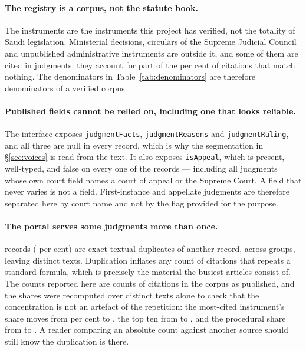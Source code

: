 \documentclass[11pt]{article}
\begin{document}
\paragraph{The registry is a corpus, not the statute book.} The
\nInstruments{} instruments are the instruments this project has verified,
not the totality of Saudi legislation. Ministerial decisions, circulars of
the Supreme Judicial Council and unpublished administrative instruments are
outside it, and some of them are cited in judgments: they account for part of
the \nUnmatchedShare{} per cent of citations that match nothing. The
denominators in Table~\ref{tab:denominators} are therefore denominators of a
verified corpus.

\paragraph{Published fields cannot be relied on, including one that looks
reliable.} The interface exposes \texttt{judgmentFacts},
\texttt{judgmentReasons} and \texttt{judgmentRuling}, and all three are null
in every record, which is why the segmentation in §\ref{sec:voices} is read
from the text. It also exposes \texttt{isAppeal}, which is present,
well-typed, and false on every one of the \nJudgments{} records --- including
all \nAppellate{} judgments whose own court field names a court of appeal or
the Supreme Court. A field that never varies is not a field. First-instance
and appellate judgments are therefore separated here by court name and not by
the flag provided for the purpose.

\paragraph{The portal serves some judgments more than once.}
\nDuplicateExtra{} records (\nDuplicateShare{} per cent) are exact textual
duplicates of another record, across \nDuplicateGroups{} groups, leaving
\nDistinctTexts{} distinct texts. Duplication inflates any count of citations
that repeats a standard formula, which is precisely the material the busiest
articles consist of. The counts reported here are counts of citations in the
corpus as published, and the shares were recomputed over distinct texts alone
to check that the concentration is not an artefact of the repetition: the
most-cited instrument's share moves from \nTopOneShare{} per cent to
\nDedupTopOne{}, the top ten from \nTopTenShare{} to \nDedupTopTen{}, and
the procedural share from \nProceduralShare{} to \nDedupProcedural{}. A
reader comparing an absolute count against another source should still know
the duplication is there.
\end{document}
